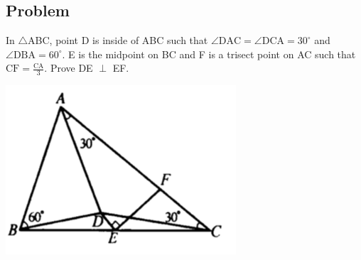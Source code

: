 \documentclass{article}
\begin{document}
\pagebreak

\subsection{Problem}
In \(\triangle\)ABC, point D is inside of ABC such that \(\angle \mathrm{DAC} = \angle \mathrm{DCA}=30^{\circ} \) and \(\angle \mathrm{DBA}=60^{\circ}\). E is the midpoint on BC and F is a trisect point on AC such that \(\mathrm{CF} = \frac{\mathrm{CA}}{3} \). Prove DE \(\perp\) EF.

\includegraphics{Picture21.png}
\end{document}
